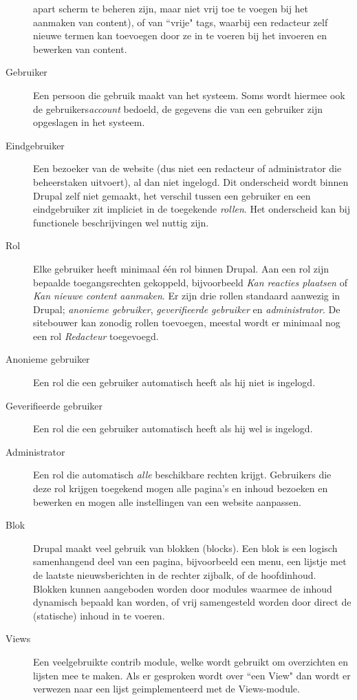 \begin{description}
apart scherm te beheren zijn, maar niet vrij toe te voegen bij het aanmaken van 
content), of van ``vrije" tags, waarbij een redacteur zelf nieuwe termen kan 
toevoegen door ze in te voeren bij het invoeren en bewerken van content. 
\item[Gebruiker] Een persoon die gebruik maakt van het systeem. Soms wordt 
hiermee ook de gebruikers\emph{account} bedoeld, de gegevens die van een 
gebruiker zijn opgeslagen in het systeem.
\item[Eindgebruiker] Een bezoeker van de website (dus niet een redacteur of 
administrator die beheerstaken uitvoert), al dan niet ingelogd. Dit onderscheid 
wordt binnen Drupal zelf niet gemaakt, het verschil tussen een gebruiker en een 
eindgebruiker zit impliciet in de toegekende \emph{rollen}. Het onderscheid kan 
bij functionele beschrijvingen wel nuttig zijn. 
\item[Rol] Elke gebruiker heeft minimaal \'e\'en rol binnen Drupal. Aan 
een rol zijn bepaalde toegangsrechten gekoppeld, bijvoorbeeld \emph{Kan reacties 
plaatsen} of \emph{Kan nieuwe content aanmaken}. Er zijn drie rollen standaard 
aanwezig in Drupal; \emph{anonieme gebruiker}, \emph{geverifieerde gebruiker} en 
\emph{administrator}. De sitebouwer kan zonodig rollen toevoegen, meestal wordt 
er minimaal nog een rol \emph{Redacteur} toegevoegd.
\item[Anonieme gebruiker] Een rol die een gebruiker automatisch heeft als hij 
niet is ingelogd.
\item[Geverifieerde gebruiker] Een rol die een gebruiker automatisch heeft als 
hij wel is ingelogd.
\item[Administrator] Een rol die automatisch \emph{alle} beschikbare rechten 
krijgt. Gebruikers die deze rol krij\-gen toegekend mogen alle pagina's en 
inhoud bezoeken en bewerken en mogen alle instellingen van een website 
aanpassen. 
\item[Blok] Drupal maakt veel gebruik van blokken (blocks). Een blok is een 
logisch samenhangend deel van een pagina, bijvoorbeeld een menu, een lijstje met 
de laatste nieuwsberichten in de rechter zijbalk, of de hoofdinhoud. Blokken 
kunnen aangeboden worden door modules waarmee de inhoud dynamisch bepaald kan 
worden, of vrij samengesteld worden door direct de (statische) inhoud in te 
voeren.
\item[Views] Een veelgebruikte contrib module, welke wordt gebruikt om 
overzichten en lijsten mee te maken. Als er gesproken wordt over ``een 
View" dan wordt er verwezen naar een lijst geimplementeerd met de Views-module. 

\end{description}
